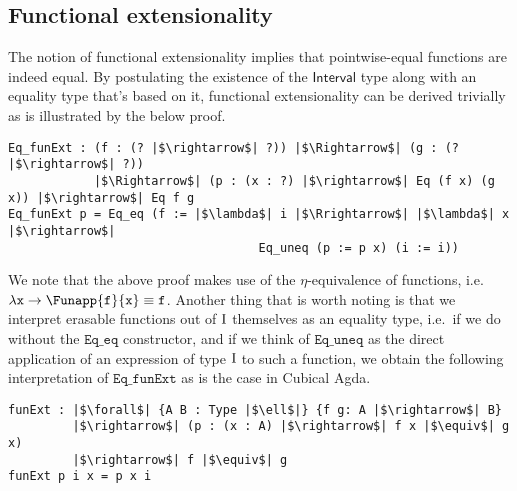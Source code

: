 \documentclass[12pt,twoside,maitrise]{dms}
\theoremstyle{definition}
\numberwithin{equation}{section}
\numberwithin{table}{chapter}
\numberwithin{figure}{chapter}
\newcommand\id[1] {\texttt{#1}}
\newcommand\type[1] {\textsf{#1}} %
\begin{document}
\subsection*{Functional extensionality}\label{subsec:funext}
The notion of functional extensionality implies that pointwise-equal functions
are indeed equal. By postulating the existence of the $\type{Interval}$ type
along with an equality type that's based on it, functional extensionality can be
derived trivially as is illustrated by the below proof.

\begin{verbatim}
Eq_funExt : (f : (? |$\rightarrow$| ?)) |$\Rightarrow$| (g : (? |$\rightarrow$| ?))
            |$\Rightarrow$| (p : (x : ?) |$\rightarrow$| Eq (f x) (g x)) |$\rightarrow$| Eq f g
Eq_funExt p = Eq_eq (f := |$\lambda$| i |$\Rrightarrow$| |$\lambda$| x |$\rightarrow$|
                                   Eq_uneq (p := p x) (i := i))
\end{verbatim}

We note that the above proof makes use of the $\eta$-equivalence of functions,
i.e. $\lambda \id{x} \rightarrow \Funapp{\id{f}}{\id{x}} \equiv \id{f}$. Another
thing that is worth noting is that we interpret erasable functions out of $\mathrm{I}$
themselves as an equality type, i.e.\ if we do without the $\id{Eq\_eq}$
constructor, and if we think of $\id{Eq\_uneq}$ as the direct application of an
expression of type $\mathrm{I}$ to such a function, we obtain the following
interpretation of $\id{Eq\_funExt}$ as is the case in Cubical Agda.

\begin{verbatim}
funExt : |$\forall$| {A B : Type |$\ell$|} {f g: A |$\rightarrow$| B}
         |$\rightarrow$| (p : (x : A) |$\rightarrow$| f x |$\equiv$| g x)
         |$\rightarrow$| f |$\equiv$| g
funExt p i x = p x i
\end{verbatim}
\end{document}
